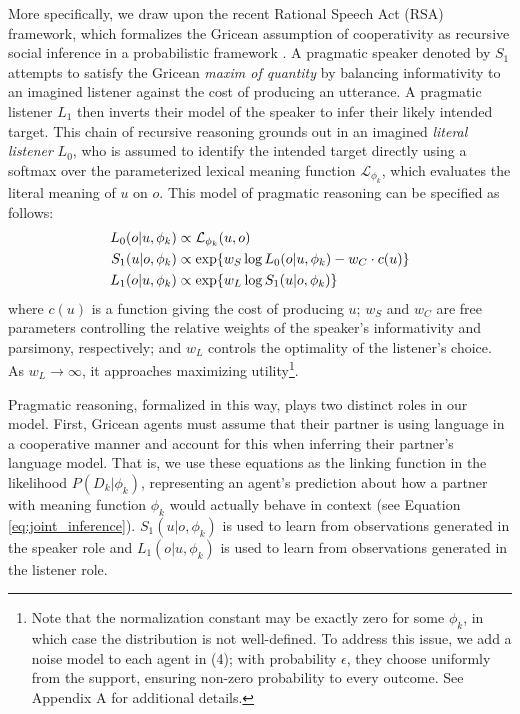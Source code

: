 More specifically, we draw upon the recent Rational Speech Act (RSA) framework, which formalizes the Gricean assumption of cooperativity as recursive social inference in a probabilistic framework \cite{frank_predicting_2012,goodman_pragmatic_2016,FrankeJager16_ProbabilisticPragmatics}.
A pragmatic speaker denoted by $S_1$ attempts to satisfy the Gricean \emph{maxim of quantity} by balancing informativity to an imagined listener against the cost of producing an utterance. 
A pragmatic listener $L_1$ then inverts their model of the speaker to infer their likely intended target.
This chain of recursive reasoning grounds out in an imagined \emph{literal listener} $L_0$, who is assumed to identify the intended target directly using a softmax over the parameterized lexical meaning function $\mathcal{L}_{\phi_k}$, which evaluates the literal meaning of $u$ on $o$.
This model of pragmatic reasoning can be specified as follows:
\begin{align}
L_0(o | u, \phi_k) &\propto  \mathcal{L}_{\phi_k}(u,o)\hfill\label{eq:RSA}\\
S_1(u | o, \phi_k) &\propto   \exp\{w_S \log L_0(o | u, \phi_k) - w_C \cdot c(u)\}\nonumber   \\
L_1(o | u, \phi_k) &\propto   \exp\{w_L \log S_1(u | o, \phi_k)\}\nonumber
\end{align}
where $c(u)$ is a function giving the cost of producing $u$; $w_S$ and $w_C$ are free parameters controlling the relative weights of the speaker's informativity and parsimony, respectively; and $w_L$ controls the optimality of the listener's choice. 
As $w_L \rightarrow \infty$, it approaches maximizing utility\footnote{Note that the normalization constant may be exactly zero for some $\phi_k$, in which case the distribution is not well-defined. To address this issue, we add a noise model to each agent in (4); with probability $\epsilon$, they choose uniformly from the support, ensuring non-zero probability to every outcome. See Appendix A for additional details.}.

Pragmatic reasoning, formalized in this way, plays two distinct roles in our model.
First, Gricean agents must assume that their partner is using language in a cooperative manner and account for this when inferring their partner's language model.
That is, we use these equations as the linking function in the likelihood $P(D_k | \phi_k)$, representing an agent's prediction about how a partner with meaning function $\phi_k$ would actually behave in context (see Equation \ref{eq:joint_inference}). 
$S_1(u|o,\phi_k)$ is used to learn from observations generated in the speaker role and $L_1(o|u,\phi_k)$ is used to learn from observations generated in the listener role.

